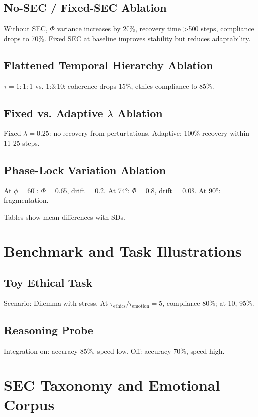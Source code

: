 \documentclass[11pt,a4paper]{article}
\begin{document}
\subsection{No-SEC / Fixed-SEC Ablation}
Without SEC, \(\Phi\) variance increases by 20\%, recovery time >500 steps, compliance drops to 70\%. Fixed SEC at baseline improves stability but reduces adaptability.

\subsection{Flattened Temporal Hierarchy Ablation}
\(\tau = 1:1:1\) vs. 1:3:10: coherence drops 15\%, ethics compliance to 85\%.

\subsection{Fixed vs. Adaptive \texorpdfstring{\(\lambda\)}{lambda} Ablation}
Fixed \(\lambda = 0.25\): no recovery from perturbations. Adaptive: 100\% recovery within 11-25 steps.

\subsection{Phase-Lock Variation Ablation}
At \(\phi = 60^\circ\): \(\Phi = 0.65\), drift = 0.2. At 74°: \(\Phi = 0.8\), drift = 0.08. At 90°: fragmentation.

Tables show mean differences with SDs.

\section{Benchmark and Task Illustrations}
\label{app:benchmarks}

\subsection{Toy Ethical Task}
Scenario: Dilemma with stress. At \(\tau_{\text{ethics}}/\tau_{\text{emotion}} = 5\), compliance 80\%; at 10, 95\%.

\subsection{Reasoning Probe}
Integration-on: accuracy 85\%, speed low. Off: accuracy 70\%, speed high.

\section{SEC Taxonomy and Emotional Corpus}
\label{app:sec}
\end{document}
